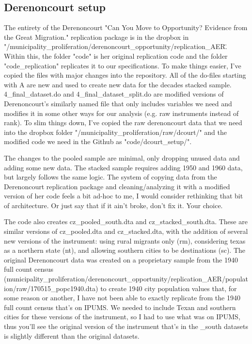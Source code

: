 \documentclass{article}
\begin{document}
\subsection{Derenoncourt setup}
The entirety of the Derenoncourt "Can You Move to Opportunity? Evidence from the Great Migration." replication package is in the dropbox in "/municipality\_proliferation/derenoncourt\_opportunity/replication\_AER\". Within this, the folder "code" is her original replication code and the folder "code\_replication" replicates it to our specifications. To make things easier, I've copied the files with major changes into the repository. All of the do-files starting with A are new and used to create new data for the decades stacked sample. 4\_final\_dataset.do and 4\_final\_dataset\_split.do are modified versions of Derenoncourt's similarly named file that only includes variables we need and modifies it in some other ways for our analysis (e.g. raw instruments instead of rank). To slim things down, I've copied the raw derenoncourt data that we need into the dropbox folder "/municipality\_proliferation/raw/dcourt/" and the modified code we need in the Github as "code/dcourt\_setup/". 

The changes to the pooled sample are minimal, only dropping unused data and adding some new data. The stacked sample requires adding 1950 and 1960 data, but largely follows the same logic. The system of copying data from the Derenoncourt replication package and cleaning/analyzing it with a modified version of her code feels a bit ad-hoc to me, I would consider rethinking that bit of architecture. Or just say that if it ain't broke, don't fix it. Your choice.

The code also creates cz\_pooled\_south.dta and cz\_stacked\_south.dta. These are similar versions of cz\_pooled.dta and cz\_stacked.dta, with the addition of several new versions of the instrument: using rural migrants only (rm), considering texas as a northern state (nt), and allowing southern cities to be destinations (sc). The original Derenoncourt data was created on a proprietary sample from the 1940 full count census (municipality\_proliferation/derenoncourt\_opportunity/replication\_AER/population/raw/170515\_popc1940.dta) to create 1940 city population values that, for some reason or another, I have not been able to exactly replicate from the 1940 full count census that's on IPUMS. We needed to include Texan and southern cities for these versions of the instrument, so I had to use what was on IPUMS, thus you'll see the original version of the instrument that's in the \_south datasets is slightly different than the original datasets.
\end{document}
